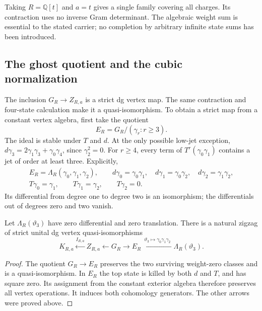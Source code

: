 Taking \(R=\mathbb Q[t]\) and \(a=t\) gives a single family covering
all charges.  Its contraction uses no inverse Gram determinant.
The algebraic weight sum is essential to the stated carrier; no
completion by arbitrary infinite state sums has been introduced.

\subsection{The ghost quotient and the cubic normalization}

The inclusion \(G_R\to Z_{R,a}\) is a strict dg vertex map.  The
same contraction and four-state calculation make it a
quasi-isomorphism.  To obtain a strict map from a constant vertex
algebra, first take the quotient
\[
 E_R=G_R/(\gamma_r:r\geq3).
\]
The ideal is stable under \(T\) and \(d\).  At the only possible
low-jet exception,
\(d\gamma_3=2\gamma_1\gamma_3+\gamma_0\gamma_4\), since
\(\gamma_2^2=0\).  For \(r\geq4\), every term of
\(T^r(\gamma_0\gamma_1)\) contains a jet of order at least three.
Explicitly,
\begin{equation}\label{bv:eq:three-jets}
 \begin{gathered}
 E_R=\Lambda_R(\gamma_0,\gamma_1,\gamma_2),\qquad
 d\gamma_0=\gamma_0\gamma_1,\quad
 d\gamma_1=\gamma_0\gamma_2,\quad
 d\gamma_2=\gamma_1\gamma_2,\\
 T\gamma_0=\gamma_1,\qquad T\gamma_1=\gamma_2,\qquad T\gamma_2=0.
 \end{gathered}
\end{equation}
Its differential from degree one to degree two is an isomorphism;
the differentials out of degrees zero and two vanish.

\begin{corollary}\label{bv:cor:zigzag}
Let \(\Lambda_R(\vartheta_3)\) have zero differential and zero
translation.  There is a natural zigzag of strict unital dg vertex
quasi-isomorphisms
\begin{equation}\label{bv:eq:zigzag}
 K_{R,a}\xleftarrow{I_{R,a}}Z_{R,a}
 \xleftarrow{}G_R\xrightarrow{}E_R
 \xleftarrow{\ \vartheta_3\mapsto\gamma_0\gamma_1\gamma_2\ }
 \Lambda_R(\vartheta_3).
\end{equation}
\end{corollary}

\begin{proof}
The quotient \(G_R\to E_R\) preserves the two surviving
weight-zero classes and is a quasi-isomorphism.  In \(E_R\) the top
state is killed by both \(d\) and \(T\), and has square zero.
Its assignment from the constant exterior algebra therefore preserves
all vertex operations.  It induces both cohomology generators.
The other arrows were proved above.
\end{proof}

